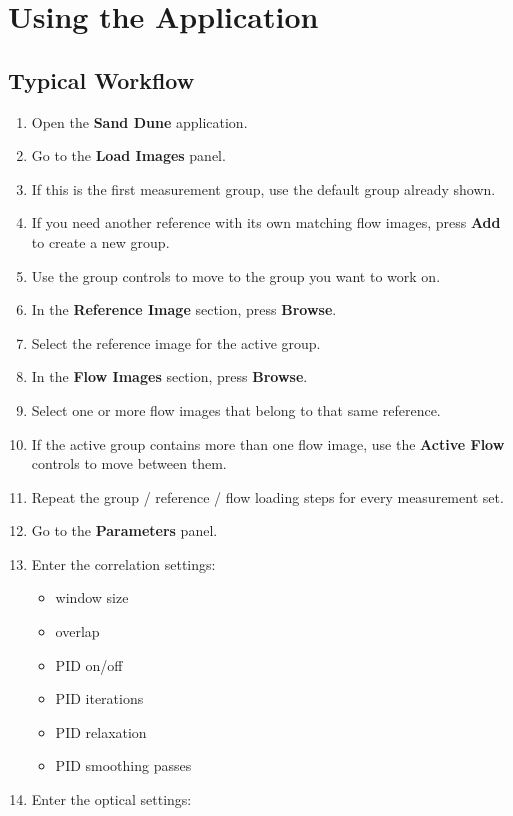 \documentclass[11pt]{article}
\begin{document}
\section{Using the Application}
\label{sec:usage}

\subsection{Typical Workflow}

\begin{enumerate}
    \item Open the \textbf{Sand Dune} application.
    \item Go to the \textbf{Load Images} panel.
    \item If this is the first measurement group, use the default group already shown.
    \item If you need another reference with its own matching flow images, press \textbf{Add} to create a new group.
    \item Use the group controls to move to the group you want to work on.
    \item In the \textbf{Reference Image} section, press \textbf{Browse}.
    \item Select the reference image for the active group.
    \item In the \textbf{Flow Images} section, press \textbf{Browse}.
    \item Select one or more flow images that belong to that same reference.
    \item If the active group contains more than one flow image, use the \textbf{Active Flow} controls to move between them.
    \item Repeat the group / reference / flow loading steps for every measurement set.
    \item Go to the \textbf{Parameters} panel.
    \item Enter the correlation settings:
    \begin{itemize}
        \item window size
        \item overlap
        \item PID on/off
        \item PID iterations
        \item PID relaxation
        \item PID smoothing passes
    \end{itemize}
    \item Enter the optical settings:

\end{enumerate}
\end{document}
